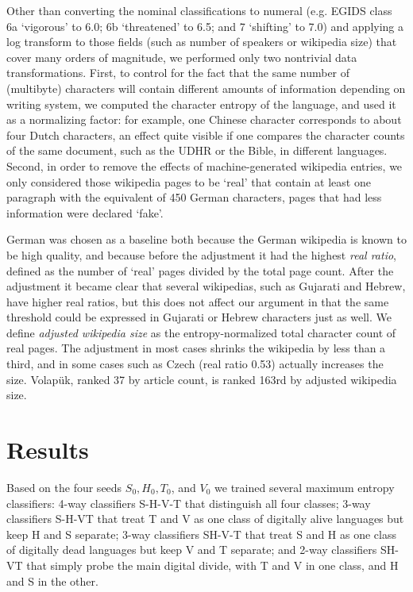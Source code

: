 \documentclass[10pt]{article}
\begin{document}
{\color{black} Other than converting the nominal classifications to numeral
  (e.g. EGIDS class 6a `vigorous' to 6.0; 6b `threatened' to 6.5; and 7
  `shifting' to 7.0) and applying a log transform to those fields (such as
  number of speakers or wikipedia size) that cover many orders of magnitude,
  we performed only two nontrivial data transformations.}  First, to control
for the fact that the same number of (multibyte) characters will contain
different amounts of information depending on writing system, we computed the
character entropy of the language, and used it as a normalizing factor: for
example, one Chinese character corresponds to about four Dutch characters, 
{\color{black} an effect quite visible if one compares the character counts of the 
same document, such as the UDHR or the Bible, in different languages.} 
Second, in order to remove the effects of machine-generated wikipedia entries,
we only considered those wikipedia pages to be `real' that contain at least
one paragraph with the equivalent of 450 German characters, pages that had
less information were declared `fake'.  

German was chosen as a baseline both because the German wikipedia is known to
be high quality, and because before the adjustment it had the highest {\it
  real ratio}, defined as the number of `real' pages divided by the total 
page count. After the adjustment it became clear that several wikipedias, such as
Gujarati and Hebrew, have higher real ratios, but this does not affect our
argument {\color{black} in that the same threshold could be expressed in
  Gujarati or Hebrew characters just as well.}  We define {\it adjusted
  wikipedia size} as the entropy-normalized total character count of real
pages. The adjustment in most cases shrinks the wikipedia by less than a
third, and in some cases such as Czech (real ratio 0.53) actually increases
the size. Volap\"{u}k, ranked 37 by article count, is ranked 163rd by adjusted
wikipedia size.

\section*{Results}

Based on the four seeds $S_0, H_0, T_0$, and $V_0$ we trained several maximum
entropy classifiers: 4-way classifiers S-H-V-T that distinguish all four
classes; 3-way classifiers S-H-VT that treat T and V as one class of digitally
alive languages but keep H and S separate; 3-way classifiers SH-V-T that treat
S and H as one class of digitally dead languages but keep V and T separate;
and 2-way classifiers SH-VT that simply probe the main digital divide, with T
and V in one class, and H and S in the other.
\end{document}
